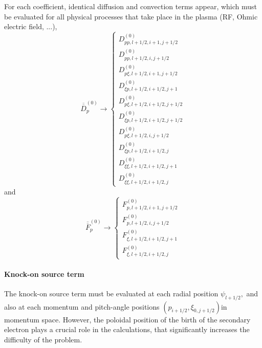 For each coefficient, identical diffusion and convection terms appear, which
must be evaluated for all physical processes that take place in the plasma
(RF, Ohmic electric field, ...), 
\begin{equation}
\overline{\overline{D}}_{p}^{\left( 0\right) }\rightarrow \left\{ 
\begin{array}{l}
D_{pp,l+1/2,i+1,j+1/2}^{\left( 0\right) } \\ 
D_{pp,l+1/2,i,j+1/2}^{\left( 0\right) } \\ 
D_{p\xi ,l+1/2,i+1,j+1/2}^{\left( 0\right) } \\ 
D_{\xi p,l+1/2,i+1/2,j+1}^{\left( 0\right) } \\ 
D_{p\xi ,l+1/2,i+1/2,j+1/2}^{\left( 0\right) } \\ 
D_{\xi p,l+1/2,i+1/2,j+1/2}^{\left( 0\right) } \\ 
D_{p\xi ,l+1/2,i,j+1/2}^{\left( 0\right) } \\ 
D_{\xi p,l+1/2,i+1/2,j}^{\left( 0\right) } \\ 
D_{\xi \xi ,l+1/2,i+1/2,j+1}^{\left( 0\right) } \\ 
D_{\xi \xi ,l+1/2,i+1/2,j}^{\left( 0\right) }%
\end{array}
\right.
\end{equation}
and 
\begin{equation}
\overline{\overline{F}}_{p}^{\left( 0\right) }\rightarrow \left\{ 
\begin{array}{l}
F_{p,l+1/2,i+1,j+1/2}^{\left( 0\right) } \\ 
F_{p,l+1/2,i,j+1/2}^{\left( 0\right) } \\ 
F_{\xi ,l+1/2,i+1/2,j+1}^{\left( 0\right) } \\ 
F_{\xi ,l+1/2,i+1/2,j}^{\left( 0\right) }%
\end{array}
\right.
\end{equation}

\paragraph{Knock-on source term}

The knock-on source term must be evaluated at each radial position $\psi
_{l+1/2},$ and also at each momentum and pitch-angle positions $\left(
p_{i+1/2},\xi _{0,j+1/2}\right) $in momentum space. However, the poloidal
position of the birth of the secondary electron plays a crucial role in the
calculations, that significantly increases the difficulty of the problem.

